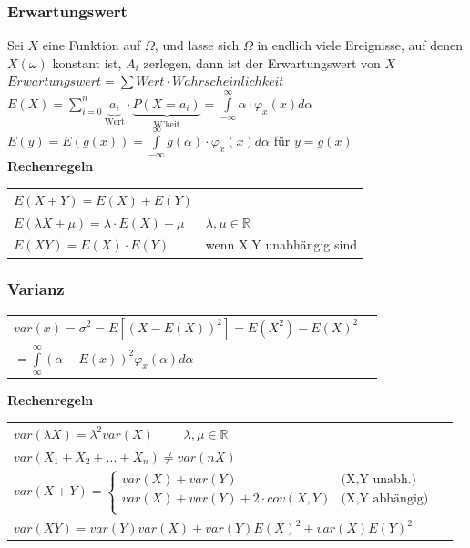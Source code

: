         
        \subsubsection{Erwartungswert}
		Sei $X$ eine Funktion auf $\Omega$, und lasse sich $\Omega$ in endlich viele
		Ereignisse, auf denen $X(\omega)$ konstant ist, $A_i$ zerlegen, dann ist der
		Erwartungswert von $X$\\
        $Erwartungswert = \sum Wert \cdot Wahrscheinlichkeit$\\
		$E(X)=\sum\limits_{i=0}^n \underbrace{a_i}_{\text{Wert}}\cdot \underbrace{P(X=a_i)}_{\text{W'keit}}=\int\limits_{-\infty}^\infty \alpha \cdot \varphi_x(x)d\alpha$\\
		$E(y)=E(g(x))=\int\limits_{-\infty}^\infty g(\alpha) \cdot \varphi_x(x)d\alpha$ \hspace{2mm} für $y=g(x)$\\
		

		\textbf{Rechenregeln}\\
			\begin{tabular}{ll}
    		$E(X+Y)=E(X)+E(Y)$\\
    		$E(\lambda X + \mu)=\lambda \cdot E(X) + \mu$ & $\lambda, \mu \in \mathbb{R}$\\
    		$E(XY) = E(X)\cdot E(Y)$ & wenn X,Y unabhängig sind\\
    		\end{tabular}
      
	\subsubsection{Varianz }

		\begin{tabular}{ll}
		$var(x)=\sigma ^2=E[(X-E(X))^2]=E(X^2)-E(X)^2$\\$=\int\limits_\infty^\infty(\alpha - E(x))^2\varphi_x(\alpha)d\alpha$\\
		\end{tabular}
		
		\textbf{Rechenregeln}\\
			\begin{tabular}{ll}
        	$var(\lambda X)=\lambda^2 var(X) \qquad $ $\lambda, \mu \in
        	\mathbb{R}$\\ 
        	$var(X_1+X_2+\ldots+X_n) \neq var(n X)$ \\
        	$var(X+Y)= \begin{cases}
	                      var(X)+var(Y)
	                      &	\text{(X,Y unabh.)}\\                     
	                      var(X) + var(Y) + 2 \cdot cov(X,Y) 
	                      &	\text{(X,Y abhängig)}\\
                     \end{cases} $ \\
        	$var(X Y)= var(Y)var(X)+var(Y)E(X)^2+var(X)E(Y)^2$
        	\end{tabular}
        	
